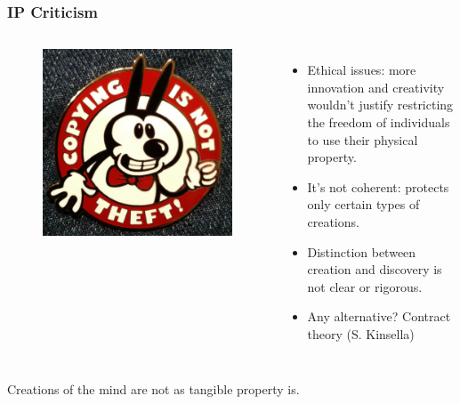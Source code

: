 \documentclass{beamer}
\begin{document}
\begin{frame}
\frametitle{IP Criticism}

\begin{columns}
\column[t]{5cm}

\begin{figure}
\vspace{-0.6cm}
\begin{flushleft}
	\includegraphics[scale=0.1,clip=true]{figs/GlamCamp_NY_Kippelboy_nina_Paley.jpg}
\end{flushleft}
\end{figure}

\column[t]{7cm}
\vspace{-0.5cm}
\begin{itemize}
\item \alert{Ethical issues}: more innovation and creativity wouldn't justify restricting the freedom of individuals to use their physical property.
\item It's not coherent: protects only certain types of creations.
\item Distinction between creation and discovery is not clear or rigorous.
\item Any alternative? Contract theory (S. Kinsella) 
\end{itemize}

\end{columns}

\begin{center}
\alert{Creations of the mind are not as tangible property is.}
\end{center}

\end{frame}
\end{document}
